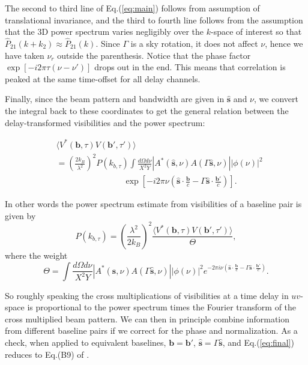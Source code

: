 \documentclass[twocolumn,apj,numberedappendix]{emulateapj}
\renewcommand\[{\begin{equation}}
\renewcommand\]{\end{equation}}
\begin{document}
The second to third line of Eq.(\ref{eq:main}) follows from assumption of translational invariance, and the third to fourth line follows from the assumption that
the 3D power spectrum varies negligibly over the $k$-space of interest
so that $\hat{P}_{21}(k+k_{2})\approx\hat{P}_{21}(k)$. Since $\Gamma$
is a sky rotation, it does not affect $\nu$, hence we have taken $\nu_{r}$
outside the parenthesis. Notice that the phase factor $\exp\left[-i2\pi\tau\left(\nu-\nu'\right)\right]$
drops out in the end. This means that correlation is peaked at the same time-offset for all delay channels. 

Finally, since the beam pattern and bandwidth are given in $\hat{\boldsymbol{s}}$
and $\nu$, we convert the integral back to these coordinates to get
the general relation between the delay-transformed visibilities and
the power spectrum:

\begin{equation}
\begin{aligned} & \langle V^{*}(\boldsymbol{b},\tau)V(\boldsymbol{b'},\tau')\rangle\\
 & =\left(\frac{2k_{B}}{\lambda^{2}}\right)^{2}P(k_{b,\tau})\int\frac{d\Omega d\nu}{X^{2}Y}|A^{*}(\hat{\boldsymbol{s}},\nu)A(\Gamma\hat{\boldsymbol{s}},\nu)||\phi(\nu)|^{2}\\
 & \qquad \qquad \qquad \qquad \exp\left[-i2\pi\nu\left(\hat{\boldsymbol{s}}\cdot\frac{\boldsymbol{b}}{c}-\Gamma\hat{\boldsymbol{s}}\cdot\frac{\boldsymbol{b'}}{c}\right)\right].\end{aligned}
\label{eq:final}
\end{equation}

In other words the power spectrum estimate from visibilities of a baseline pair is given by 
\begin{equation}
 P(k_{b,\tau}) = \left(\frac{\lambda^{2}}{2k_{B}}\right)^{2} \frac{\langle V^{*}(\boldsymbol{b},\tau)V(\boldsymbol{b'},\tau')\rangle}{\Theta}, 
 \label{eq:opp}
\end{equation}
where the weight
\begin{equation}
\Theta =\int\frac{d\Omega d\nu}{X^{2}Y}|A^{*}(\hat{\boldsymbol{s}},\nu)A(\Gamma\hat{\boldsymbol{s}},\nu)||\phi(\nu)|^{2} e^{-2\pi i\nu\left(\hat{\boldsymbol{s}}\cdot\frac{\boldsymbol{b}}{c}-\Gamma\hat{\boldsymbol{s}}\cdot\frac{\boldsymbol{b'}}{c}\right)}. 
\label{eq:Theta}
\end{equation}



So roughly speaking the cross multiplications of visibilities at a time delay
in $uv$-space is proportional to the power spectrum times the Fourier
transform of the cross multiplied beam pattern. We can then in principle
combine information from different baseline pairs if we correct for
the phase and normalization. As a check, when applied to equivalent baselines,
$\boldsymbol{b}=\boldsymbol{b'}$, $\hat{\boldsymbol{s}}=\Gamma\hat{\boldsymbol{s}}$, and Eq.(\ref{eq:final}) reduces to Eq.(B9) of \cite{paper32}. 
\end{document}
